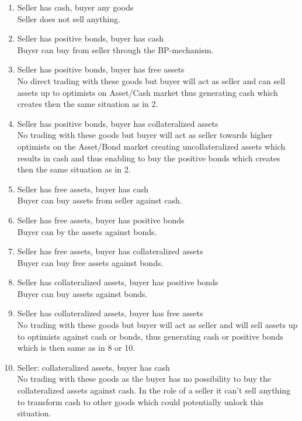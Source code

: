 \documentclass[Bachelorarbeit.tex]{subfiles}
\begin{document}
\begin{enumerate}
\item Seller has cash, buyer any goods \\ Seller does not sell anything. 
\item Seller has positive bonds, buyer has cash \\ Buyer can buy from seller through the BP-mechanism.
\item Seller has positive bonds, buyer has free assets \\ No direct trading with these goods but buyer will act as seller and can sell assets up to optimists on Asset/Cash market thus generating cash which creates then the same situation as in 2.
\item Seller has positive bonds, buyer has collateralized assets \\ No trading with these goods but buyer will act as seller towards higher optimists on the Asset/Bond market creating uncollateralized assets which results in cash and thus enabling to buy the positive bonds which creates then the same situation as in 2.
\item Seller has free assets, buyer has cash \\ Buyer can buy assets from seller against cash.
\item Seller has free assets, buyer has positive bonds \\ Buyer can by the assets against bonds.
\item Seller has free assets, buyer has collateralized assets \\ Buyer can buy free assets against bonds.
\item Seller has collateralized assets, buyer has positive bonds \\ Buyer can buy assets against bonds.
\item Seller has collateralized assets, buyer has free assets \\ No trading with these goods but buyer will act as seller and will sell assets up to optimists against cash or bonds, thus generating cash or positive bonds which is then same as in 8 or 10.
\item Seller: collateralized assets, buyer has cash \\ No trading with these goods as the buyer has no possibility to buy the collateralized assets against cash. In the role of a seller it can't sell anything to transform cash to other goods which could potentially unlock this situation.
\end{enumerate}
\end{document}
